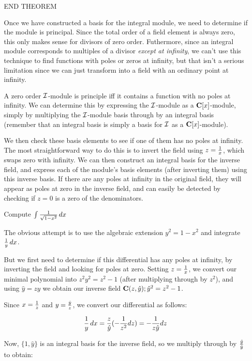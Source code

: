 END THEOREM

Once we have constructed a basis for the integral module, we need to
determine if the module is principal.  Since the total order of a
field element is always zero, this only makes sense for divisors of
zero order.  Futhermore, since an integral module corresponds to
multiples of a divisor {\it except at infinity}, we can't use this
technique to find functions with poles or zeros at infinity, but that
isn't a serious limitation since we can just transform into a field
with an ordinary point at infinity.

A zero order ${\cal I}$-module is principle iff it contains a function
with no poles at infinity.  We can determine this by expressing the
${\cal I}$-module as a ${\bf C}[x]$-module, simply by multiplying the
${\cal I}$-module basis through by an integral basis (remember that an
integral basis is simply a basis for ${\cal I}$ as a ${\bf
C}[x]$-module).

We then check these basis elements to see if one of them has no poles
at infinity.  The most straightforward way to do this is to invert the
field using $z={1\over x}$, which swaps zero with infinity.  We can
then construct an integral basis for the inverse field, and express
each of the module's basis elements (after inverting them) using this
inverse basis.  If there are any poles at infinity in the original
field, they will appear as poles at zero in the inverse field, and can
easily be detected by checking if $z=0$ is a zero of the denominators.

\example Compute $\int {1\over{\sqrt{1-x^2}}} \,dx$

The obvious attempt is to use the algebraic extension $y^2=1-x^2$ and
integrate ${1\over y}\,dx$.

But we first need to determine if this differential has any poles at
infinity, by inverting the field and looking for poles at zero.
Setting $z={1\over x}$, we convert our minimal polynomial into
$z^2y^2=z^2-1$ (after multiplying through by $z^2$), and using
$\hat{y}=zy$ we obtain our inverse field ${\bf C}(z,\hat{y}); \hat{y}^2=z^2-1$.

Since $x={1\over z}$ and $y={\hat{y}\over z}$, we convert our differential as follows:

 $${1\over y}\,dx ={z\over\hat{y}} (-{1\over{z^2}} dz) = -{1\over{z\hat{y}}} dz$$

Now, $\{1, \hat{y}\}$ is an integral basis for the inverse field, so we
multiply through by $\hat{y}\over\hat{y}$ to obtain:

